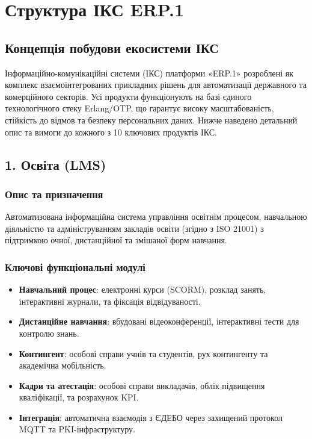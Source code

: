 \chapter{Структура ІКС ERP.1}

\section{Концепція побудови екосистеми ІКС}
Інформаційно-комунікаційні системи (ІКС) платформи «ERP.1» розроблені як комплекс
взаємоінтегрованих прикладних рішень для автоматизації державного та комерційного секторів.
Усі продукти функціонують на базі єдиного технологічного стеку Erlang/OTP,
що гарантує високу масштабованість, стійкість до відмов та безпеку персональних даних.
Нижче наведено детальний опис та вимоги до кожного з 10 ключових продуктів ІКС.

\section{1. Освіта (LMS)}
\subsection{Опис та призначення}
Автоматизована інформаційна система управління освітнім процесом, навчальною діяльністю та адмініструванням закладів освіти (згідно з ISO 21001) з підтримкою очної, дистанційної та змішаної форм навчання.
\subsection{Ключові функціональні модулі}
\begin{itemize}
    \item \textbf{Навчальний процес}: електронні курси (SCORM), розклад занять, інтерактивні журнали, та фіксація відвідуваності.
    \item \textbf{Дистанційне навчання}: вбудовані відеоконференції, інтерактивні тести для контролю знань.
    \item \textbf{Контингент}: особові справи учнів та студентів, рух контингенту та академічна мобільність.
    \item \textbf{Кадри та атестація}: особові справи викладачів, облік підвищення кваліфікації, та розрахунок KPI.
    \item \textbf{Інтеграція}: автоматична взаємодія з ЄДЕБО через захищений протокол MQTT та PKI-інфраструктуру.
\end{itemize}

